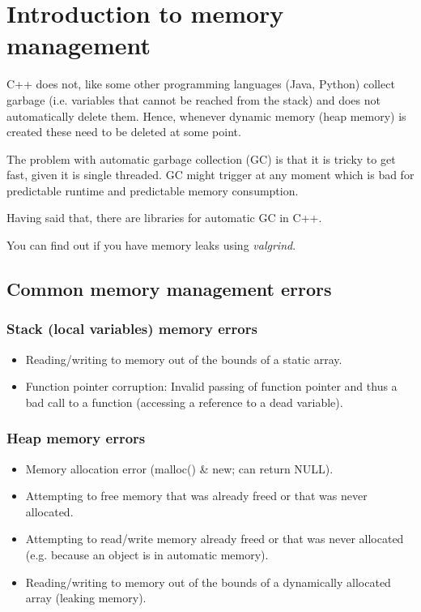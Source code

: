 \section{Introduction to memory management}

C++ does not, like some other programming languages (Java, Python) collect garbage
(i.e. variables that cannot be reached from the stack) and does not automatically delete
them. Hence, whenever dynamic memory (heap memory) is created these need to be
deleted at some point.

The problem with automatic garbage collection (GC) is that it is tricky to get fast, given it
is single threaded. GC might trigger at any moment which is bad for predictable runtime
and predictable memory consumption.

Having said that, there are libraries for automatic GC in C++.

You can find out if you have memory leaks using \emph{valgrind}.

\subsection{Common memory management errors}

\subsubsection*{Stack (local variables) memory errors}
\begin{itemize}
	\item Reading/writing to memory out of the bounds of a static array.
	\item Function pointer corruption: Invalid passing of function pointer
	and thus a  bad call to a function (accessing a reference to a dead variable).
\end{itemize}

\subsubsection*{Heap memory errors}
\begin{itemize}
	\item Memory allocation error (malloc() \& new; can return NULL).
	\item Attempting to free memory that was already freed or that was never allocated.
	\item Attempting to read/write memory already freed or that was never allocated
	(e.g. because an object is in automatic memory).
	\item Reading/writing to memory out of the bounds of a dynamically allocated array
	(leaking memory).
\end{itemize}


